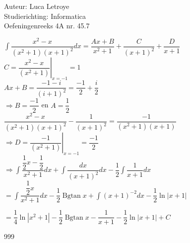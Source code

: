 \documentclass[a4paper]{article}
\newcommand{\dint}{\displaystyle\int}
\newcommand{\bgtan}{\operatorname{Bgtan}}
\begin{document}
  
\noindent \large Auteur: Luca Letroye \\
\noindent \large Studierichting: Informatica\\
\noindent \large Oefeningenreeks 4A nr. 45.7

\medskip
\normalsize

$\dint\dfrac{x^2-x}{(x^2+1)(x+1)^2}dx = \dfrac{Ax+B}{x^2+1} + \dfrac{C}{(x+1)^2} + \dfrac{D}{x+1}$\\

$C = \left. \dfrac{x^2-x}{(x^2+1)}\right|_{x=-1} = 1$\\

$Ax+B = \dfrac{-1-i}{(i+1)^2} = \dfrac{-1}{2} +\dfrac{i}{2}$\\

$\Rightarrow B = \dfrac{-1}{2}$ en $A = \dfrac{1}{2}$\\

$\dfrac{x^2-x}{(x^2+1)(x+1)^2} - \dfrac{1}{(x+1)^2} = \dfrac{-1}{(x^2+1)(x+1)}$\\

$\Rightarrow D = \left. \dfrac{-1}{(x^2+1)}\right|_{x=-1} = \dfrac{-1}{2}$\\

$\Rightarrow \dint\dfrac{\dfrac{1}{2}x-\dfrac{1}{2}}{x^2+1}dx+\dint\dfrac{dx}{(x+1)^2}dx - \dfrac{1}{2}\dint\dfrac{1}{x+1}dx$\\

$= \dint\dfrac{\dfrac{1}{2}x}{x^2+1}dx - \dfrac{1}{2}\bgtan x + \dint (x+1)^{-2}dx - \dfrac{1}{2}\ln|x+1|$

$= \dfrac{1}{4}\ln|x^2+1| - \dfrac{1}{2}\bgtan x -\dfrac{1}{x+1} - \dfrac{1}{2}\ln|x+1|+C$



\begin{thebibliography}{999}
\end{thebibliography}
\end{document}
